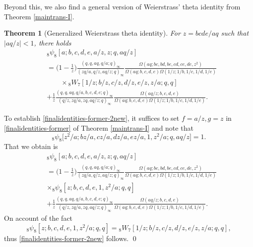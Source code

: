 \documentclass[xits,review,sort&compress]{elsarticle}
\newtheorem{dl}{Theorem}[section]
\numberwithin{equation}{section}
\def\pf{\noindent {\it Proof.} }
\begin{document}
Beyond this, we also find  a general version of Weierstrass' theta identity from  Theorem \ref{maintrans-I}.

\begin{dl}[Generalized Weierstrass theta identity]\label{dual} For $z=bcde/aq$ such that $|aq/z|<1$, there holds
 \begin{align}
 &{}_{8} \psi_{8}\left[a; b, c, d, e, a/z, z ; q, aq/z\right] \nonumber\\
 &=\bigg(1-\frac{1}{z}\bigg)\frac{(q,q,aq, q /a; q)_{\infty}}{\left(zq/a, q/z,aq/z;q\right)_{\infty}}\frac{\Omega(aq;bc,bd,be,cd,ce,de,z^2)}{\Omega(aq;b,c,d,e)\Omega(1/z;1/b,1/c,1/d,
 1/e)}\nonumber\\
  &\qquad\times{}_{8}W_{7}[1/z ; b/z, c/z, d/z, e/z, z/a; q, q] \label{finalidentities-former-2new}\\
 &+\frac{1}{z}\frac{(q,q,aq, q / a,b, c, d, e; q)_{\infty}}{(q/z,zq/a,zq,aq/z; q)_{\infty}}
 \frac{\Omega(aq/z;b,c,d,e)}{\Omega(aq; b,  c, d,  e)
 \Omega(1/z;1/b,1/c,1/d,1/e)}. \nonumber
\end{align}
 \end{dl}
  \pf  To establish \eqref{finalidentities-former-2new}, it suffices to set $f=a/z,g=z$ in  \eqref{finalidentities-former} of Theorem \ref{maintrans-I} and note that
  $$
  {}_{8}\psi_{8}\big[z^2/a; bz/a,cz/a,dz/a,
ez/a,1,z^2/a;q,aq/z\big]=1.
  $$
  That we obtain is
   \begin{align*}
 &{}_{8} \psi_{8}\left[a; b, c, d, e, a/z, z ; q, aq/z\right] \nonumber\\
 &=\bigg(1-\frac{1}{z}\bigg)\frac{(q,q,aq, q /a; q)_{\infty}}{\left(zq/a, q/z,aq/z;q\right)_{\infty}}\frac{\Omega(aq;bc,bd,be,cd,ce,de,z^2)}
 {\Omega(aq;b,c,d,e)\Omega(1/z;1/b,1/c,1/d,
 1/e)}\nonumber\\
  &\times {}_{8} \psi_{8}[z; b, c, d, e, 1, z^2/a ; q, q] \\
 &+\frac{1}{z}\frac{(q,q,aq, q / a,b, c, d, e; q)_{\infty}}{(q/z,zq/a,zq,aq/z; q)_{\infty}}
 \frac{\Omega(aq/z;b,c,d,e)}{\Omega(aq; b,  c, d,  e)
 \Omega(1/z;1/b,1/c,1/d,1/e)}. \nonumber
\end{align*}
On account of the fact
$$
{}_{8} \psi_{8}[z; b, c, d, e, 1, z^2/a ; q, q] ={}_{8}W_{7}[1/z ; b/z, c/z, d/z, e/z, z/a; q, q],
$$
thus \eqref{finalidentities-former-2new} follows.
  \qed
\end{document}
